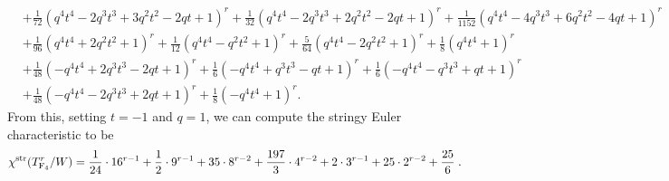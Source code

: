\documentclass[11pt,english]{amsart}
\numberwithin{equation}{section}
\numberwithin{figure}{section}
\theoremstyle{plain}
\theoremstyle{plain}
\theoremstyle{definition}
\theoremstyle{remark}
\newcommand{\F}{\operatorname{F}}
\newcommand{\str}{\textup{str}}
\begin{document}
{\begin{align*}
& + \frac{1}{72}  {\left(q^{4} t^{4} - 2  q^{3} t^{3} + 3  q^{2} t^{2} - 2  q t + 1\right)}^{r} + \frac{1}{32}  {\left(q^{4} t^{4} - 2  q^{3} t^{3} + 2  q^{2} t^{2} - 2  q t + 1\right)}^{r} + \frac{1}{1152}  {\left(q^{4} t^{4} - 4  q^{3} t^{3} + 6  q^{2} t^{2} - 4  q t + 1\right)}^{r} \\
& + \frac{1}{96}  {\left(q^{4} t^{4} + 2  q^{2} t^{2} + 1\right)}^{r} + \frac{1}{12}  {\left(q^{4} t^{4} - q^{2} t^{2} + 1\right)}^{r} + \frac{5}{64}  {\left(q^{4} t^{4} - 2  q^{2} t^{2} + 1\right)}^{r} + \frac{1}{8}  {\left(q^{4} t^{4} + 1\right)}^{r} \\
& + \frac{1}{48}  {\left(-q^{4} t^{4} + 2  q^{3} t^{3} - 2  q t + 1\right)}^{r} + \frac{1}{6}  {\left(-q^{4} t^{4} + q^{3} t^{3} - q t + 1\right)}^{r} + \frac{1}{6}  {\left(-q^{4} t^{4} - q^{3} t^{3} + q t + 1\right)}^{r} \\
& + \frac{1}{48}  {\left(-q^{4} t^{4} - 2  q^{3} t^{3} + 2  q t + 1\right)}^{r} + \frac{1}{8}  {\left(-q^{4} t^{4} + 1\right)}^{r}.
\end{align*}}
From this, setting $t = -1$ and $q = 1$, we can compute the stringy Euler characteristic to be
$$
\chi^{\str}(T_{\F_4}^r/W) = \frac{1}{24} \cdot 16^{r - 1} + \frac{1}{2} \cdot 9^{r - 1} + 35 \cdot 8^{r - 2} + \frac{197}{3} \cdot 4^{r - 2} + 2 \cdot 3^{r - 1} + 25 \cdot 2^{r - 2} + \frac{25}{6}\; .
$$
\end{document}

